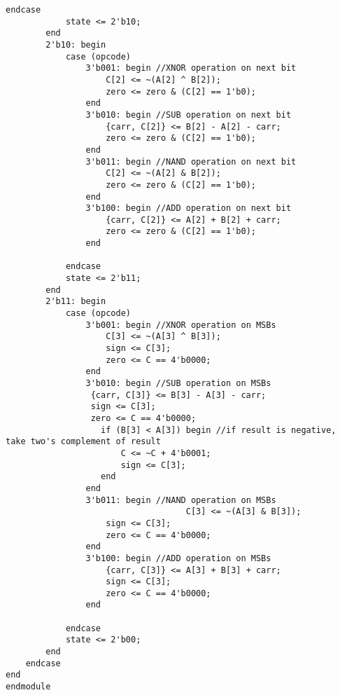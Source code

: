 \begin{lstlisting}[style=verilogStyle, caption={Verilog code for 4-bit ALU},label={lst:lstlisting}]
            endcase
            state <= 2'b10;
        end
        2'b10: begin
            case (opcode)
                3'b001: begin //XNOR operation on next bit
                    C[2] <= ~(A[2] ^ B[2]);
                    zero <= zero & (C[2] == 1'b0);
                end
                3'b010: begin //SUB operation on next bit
                    {carr, C[2]} <= B[2] - A[2] - carr;
                    zero <= zero & (C[2] == 1'b0);
                end
                3'b011: begin //NAND operation on next bit
                    C[2] <= ~(A[2] & B[2]);
                    zero <= zero & (C[2] == 1'b0);
                end
                3'b100: begin //ADD operation on next bit
                    {carr, C[2]} <= A[2] + B[2] + carr;
                    zero <= zero & (C[2] == 1'b0);
                end

            endcase
            state <= 2'b11;
        end
        2'b11: begin
            case (opcode)
                3'b001: begin //XNOR operation on MSBs
                    C[3] <= ~(A[3] ^ B[3]);
                    sign <= C[3];
                    zero <= C == 4'b0000;
                end
                3'b010: begin //SUB operation on MSBs
                 {carr, C[3]} <= B[3] - A[3] - carr;
                 sign <= C[3];
                 zero <= C == 4'b0000;
                   if (B[3] < A[3]) begin //if result is negative, take two's complement of result
                       C <= ~C + 4'b0001;
                       sign <= C[3];
                   end
                end
                3'b011: begin //NAND operation on MSBs
                                    C[3] <= ~(A[3] & B[3]);
                    sign <= C[3];
                    zero <= C == 4'b0000;
                end
                3'b100: begin //ADD operation on MSBs
                    {carr, C[3]} <= A[3] + B[3] + carr;
                    sign <= C[3];
                    zero <= C == 4'b0000;
                end

            endcase
            state <= 2'b00;
        end
    endcase
end
endmodule
\end{lstlisting}
